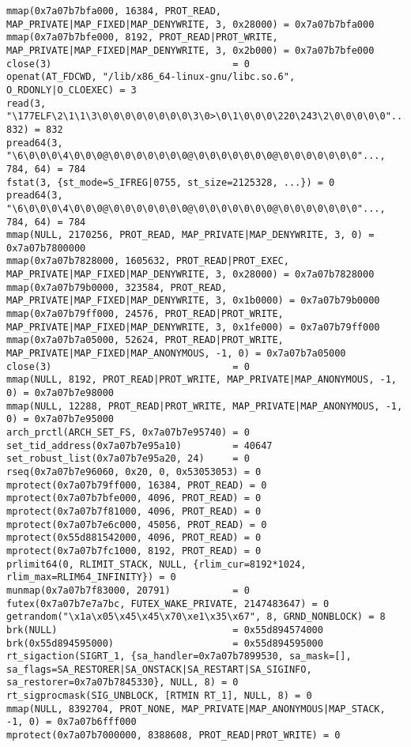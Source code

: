 \begin{verbatim}
mmap(0x7a07b7bfa000, 16384, PROT_READ, MAP_PRIVATE|MAP_FIXED|MAP_DENYWRITE, 3, 0x28000) = 0x7a07b7bfa000
mmap(0x7a07b7bfe000, 8192, PROT_READ|PROT_WRITE, MAP_PRIVATE|MAP_FIXED|MAP_DENYWRITE, 3, 0x2b000) = 0x7a07b7bfe000
close(3)                                = 0
openat(AT_FDCWD, "/lib/x86_64-linux-gnu/libc.so.6", O_RDONLY|O_CLOEXEC) = 3
read(3, "\177ELF\2\1\1\3\0\0\0\0\0\0\0\0\3\0>\0\1\0\0\0\220\243\2\0\0\0\0\0"..., 832) = 832
pread64(3, "\6\0\0\0\4\0\0\0@\0\0\0\0\0\0\0@\0\0\0\0\0\0\0@\0\0\0\0\0\0\0"..., 784, 64) = 784
fstat(3, {st_mode=S_IFREG|0755, st_size=2125328, ...}) = 0
pread64(3, "\6\0\0\0\4\0\0\0@\0\0\0\0\0\0\0@\0\0\0\0\0\0\0@\0\0\0\0\0\0\0"..., 784, 64) = 784
mmap(NULL, 2170256, PROT_READ, MAP_PRIVATE|MAP_DENYWRITE, 3, 0) = 0x7a07b7800000
mmap(0x7a07b7828000, 1605632, PROT_READ|PROT_EXEC, MAP_PRIVATE|MAP_FIXED|MAP_DENYWRITE, 3, 0x28000) = 0x7a07b7828000
mmap(0x7a07b79b0000, 323584, PROT_READ, MAP_PRIVATE|MAP_FIXED|MAP_DENYWRITE, 3, 0x1b0000) = 0x7a07b79b0000
mmap(0x7a07b79ff000, 24576, PROT_READ|PROT_WRITE, MAP_PRIVATE|MAP_FIXED|MAP_DENYWRITE, 3, 0x1fe000) = 0x7a07b79ff000
mmap(0x7a07b7a05000, 52624, PROT_READ|PROT_WRITE, MAP_PRIVATE|MAP_FIXED|MAP_ANONYMOUS, -1, 0) = 0x7a07b7a05000
close(3)                                = 0
mmap(NULL, 8192, PROT_READ|PROT_WRITE, MAP_PRIVATE|MAP_ANONYMOUS, -1, 0) = 0x7a07b7e98000
mmap(NULL, 12288, PROT_READ|PROT_WRITE, MAP_PRIVATE|MAP_ANONYMOUS, -1, 0) = 0x7a07b7e95000
arch_prctl(ARCH_SET_FS, 0x7a07b7e95740) = 0
set_tid_address(0x7a07b7e95a10)         = 40647
set_robust_list(0x7a07b7e95a20, 24)     = 0
rseq(0x7a07b7e96060, 0x20, 0, 0x53053053) = 0
mprotect(0x7a07b79ff000, 16384, PROT_READ) = 0
mprotect(0x7a07b7bfe000, 4096, PROT_READ) = 0
mprotect(0x7a07b7f81000, 4096, PROT_READ) = 0
mprotect(0x7a07b7e6c000, 45056, PROT_READ) = 0
mprotect(0x55d881542000, 4096, PROT_READ) = 0
mprotect(0x7a07b7fc1000, 8192, PROT_READ) = 0
prlimit64(0, RLIMIT_STACK, NULL, {rlim_cur=8192*1024, rlim_max=RLIM64_INFINITY}) = 0
munmap(0x7a07b7f83000, 20791)           = 0
futex(0x7a07b7e7a7bc, FUTEX_WAKE_PRIVATE, 2147483647) = 0
getrandom("\x1a\x05\x45\x45\x70\xe1\x35\x67", 8, GRND_NONBLOCK) = 8
brk(NULL)                               = 0x55d894574000
brk(0x55d894595000)                     = 0x55d894595000
rt_sigaction(SIGRT_1, {sa_handler=0x7a07b7899530, sa_mask=[], sa_flags=SA_RESTORER|SA_ONSTACK|SA_RESTART|SA_SIGINFO, sa_restorer=0x7a07b7845330}, NULL, 8) = 0
rt_sigprocmask(SIG_UNBLOCK, [RTMIN RT_1], NULL, 8) = 0
mmap(NULL, 8392704, PROT_NONE, MAP_PRIVATE|MAP_ANONYMOUS|MAP_STACK, -1, 0) = 0x7a07b6fff000
mprotect(0x7a07b7000000, 8388608, PROT_READ|PROT_WRITE) = 0

\end{verbatim}
